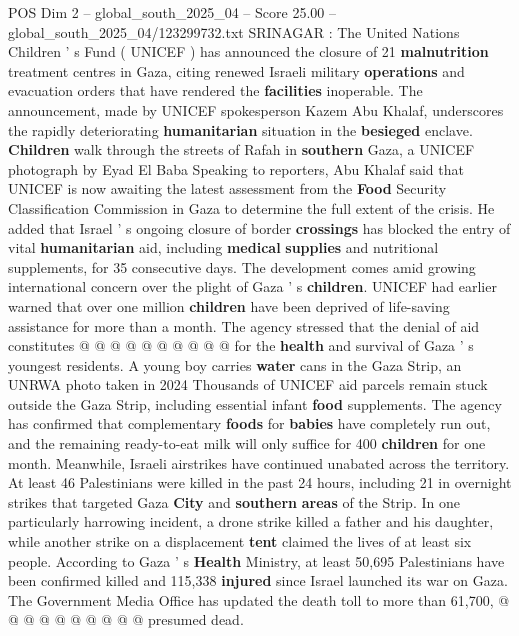 \begin{textsample}{POS Dim 2 – global\_south\_2025\_04 – Score 25.00 – global\_south\_2025\_04/123299732.txt}  \label{ex:f2_pos_274}
SRINAGAR : The United Nations Children ' s Fund ( UNICEF ) has announced the closure of 21 \textbf{malnutrition} treatment centres in Gaza, citing renewed Israeli military \textbf{operations} and evacuation orders that have rendered the \textbf{facilities} inoperable.
The announcement, made by UNICEF spokesperson Kazem Abu Khalaf, underscores the rapidly deteriorating \textbf{humanitarian} situation in the \textbf{besieged} enclave. \textbf{Children} walk through the streets of Rafah in \textbf{southern} Gaza, a UNICEF photograph by Eyad El Baba Speaking to reporters, Abu Khalaf said that UNICEF is now awaiting the latest assessment from the \textbf{Food} Security Classification Commission in Gaza to determine the full extent of the crisis.
He added that Israel ' s ongoing closure of border \textbf{crossings} has blocked the entry of vital \textbf{humanitarian} aid, including \textbf{medical} \textbf{supplies} and nutritional supplements, for 35 consecutive days.
The development comes amid growing international concern over the plight of Gaza ' s \textbf{children}.
UNICEF had earlier warned that over one million \textbf{children} have been deprived of life-saving assistance for more than a month.
The agency stressed that the denial of aid constitutes @ @ @ @ @ @ @ @ @ @ for the \textbf{health} and survival of Gaza ' s youngest residents.
A young boy carries \textbf{water} cans in the Gaza Strip, an UNRWA photo taken in 2024 Thousands of UNICEF aid parcels remain stuck outside the Gaza Strip, including essential infant \textbf{food} supplements.
The agency has confirmed that complementary \textbf{foods} for \textbf{babies} have completely run out, and the remaining ready-to-eat milk will only suffice for 400 \textbf{children} for one month.
Meanwhile, Israeli airstrikes have continued unabated across the territory.
At least 46 Palestinians were killed in the past 24 hours, including 21 in overnight strikes that targeted Gaza \textbf{City} and \textbf{southern} \textbf{areas} of the Strip.
In one particularly harrowing incident, a drone strike killed a father and his daughter, while another strike on a displacement \textbf{tent} claimed the lives of at least six people.
According to Gaza ' s \textbf{Health} Ministry, at least 50,695 Palestinians have been confirmed killed and 115,338 \textbf{injured} since Israel launched its war on Gaza.
The Government Media Office has updated the death toll to more than 61,700, @ @ @ @ @ @ @ @ @ @ presumed dead.

\end{textsample}
